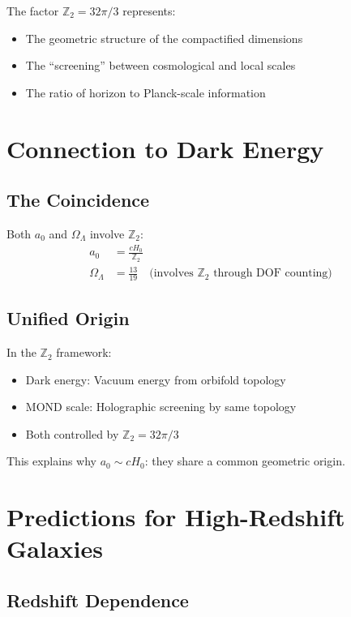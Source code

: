 \documentclass[12pt,a4paper]{article}
\begin{document}
The factor $\mathbb{Z}_2 = 32\pi/3$ represents:
\begin{itemize}
    \item The geometric structure of the compactified dimensions
    \item The ``screening'' between cosmological and local scales
    \item The ratio of horizon to Planck-scale information
\end{itemize}

\section{Connection to Dark Energy}

\subsection{The Coincidence}

Both $a_0$ and $\Omega_\Lambda$ involve $\mathbb{Z}_2$:
\begin{align}
a_0 &= \frac{cH_0}{\mathbb{Z}_2} \\
\Omega_\Lambda &= \frac{13}{19} \quad \text{(involves } \mathbb{Z}_2 \text{ through DOF counting)}
\end{align}

\subsection{Unified Origin}

In the $\mathbb{Z}_2$ framework:
\begin{itemize}
    \item Dark energy: Vacuum energy from orbifold topology
    \item MOND scale: Holographic screening by same topology
    \item Both controlled by $\mathbb{Z}_2 = 32\pi/3$
\end{itemize}

This explains why $a_0 \sim cH_0$: they share a common geometric origin.

\section{Predictions for High-Redshift Galaxies}

\subsection{Redshift Dependence}
\end{document}
